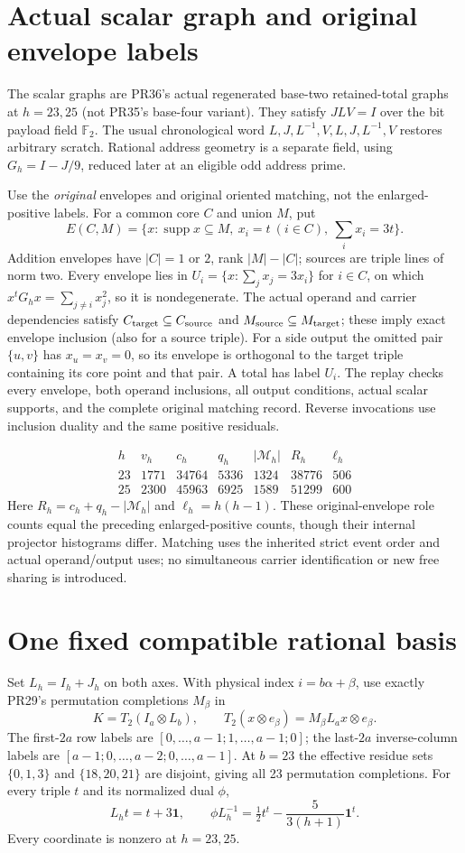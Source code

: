 \documentclass[11pt]{article}
\begin{document}
\section{Actual scalar graph and original envelope labels}
The scalar graphs are PR36's actual regenerated base-two retained-total graphs at
$h=23,25$ (not PR35's base-four variant). They satisfy $JLV=I$ over the bit payload field $\mathbb F_2$.
The usual chronological word $L,J,L^{-1},V,L,J,L^{-1},V$ restores arbitrary
scratch. Rational address geometry is a separate field, using
$G_h=I-J/9$, reduced later at an eligible odd address prime.

Use the \emph{original} envelopes and original oriented matching, not the
enlarged-positive labels. For a common core $C$ and union $M$, put
\[
 E(C,M)=\{x:\operatorname{supp}x\subseteq M,\ x_i=t\ (i\in C),\
                  \textstyle\sum_i x_i=3t\}.
\]
Addition envelopes have $|C|=1$ or $2$, rank $|M|-|C|$; sources are triple
lines of norm two. Every envelope lies in
$U_i=\{x:\sum_jx_j=3x_i\}$ for $i\in C$, on which
$x^tG_hx=\sum_{j\ne i}x_j^2$, so it is nondegenerate.
The actual operand and carrier dependencies satisfy
$C_{\rm target}\subseteq C_{\rm source}$ and
$M_{\rm source}\subseteq M_{\rm target}$; these imply exact envelope
inclusion (also for a source triple). For a side output the omitted pair
$\{u,v\}$ has $x_u=x_v=0$, so its envelope is orthogonal to the target
triple containing its core point and that pair. A total has label $U_i$.
The replay checks every envelope, both operand inclusions, all output
conditions, actual scalar supports, and the complete original matching record.
Reverse invocations use inclusion duality and the same positive residuals.

\[
\begin{array}{c|rrrrrr}
h&v_h&c_h&q_h&|\mathcal M_h|&R_h&\ell_h\\\hline
23&1771&34764&5336&1324&38776&506\\
25&2300&45963&6925&1589&51299&600
\end{array}
\]
Here $R_h=c_h+q_h-|\mathcal M_h|$ and $\ell_h=h(h-1)$.
These original-envelope role counts equal the preceding enlarged-positive
counts, though their internal projector histograms differ. Matching uses the
inherited strict event order and actual operand/output uses; no simultaneous
carrier identification or new free sharing is introduced.

\section{One fixed compatible rational basis}
Set $L_h=I_h+J_h$ on both axes. With physical index $i=b\alpha+\beta$, use
exactly PR29's permutation completions $M_\beta$ in
\[
 K=T_2(I_a\otimes L_b),\qquad
 T_2(x\otimes e_\beta)=M_\beta L_ax\otimes e_\beta.
\]
The first-$2a$ row labels are $[0,\ldots,a-1;1,\ldots,a-1;0]$;
the last-$2a$ inverse-column labels are
$[a-1;0,\ldots,a-2;0,\ldots,a-1]$. At $b=23$ the effective residue sets
$\{0,1,3\}$ and $\{18,20,21\}$ are disjoint, giving all 23 permutation
completions. For every triple $t$ and its normalized dual $\phi$,
\[
 L_ht=t+3\mathbf1,\qquad
 \phi L_h^{-1}=\tfrac12t^t-\frac5{3(h+1)}\mathbf1^t.
\]
Every coordinate is nonzero at $h=23,25$.
\end{document}
